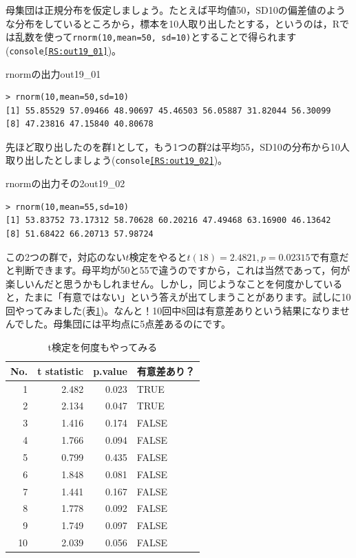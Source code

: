 \documentclass{ltjsarticle}
\begin{document}
{母集団は正規分布を仮定しましょう。たとえば平均値50，SD10の偏差値のような分布をしているところから，標本を10人取り出したとする，というのは，Rでは乱数を使って\texttt{rnorm(10,mean=50, sd=10)}とすることで得られます(\texttt{console\ref{RS:out19_01}})。

\begin{Rscreen}{rnormの出力}{out19_01}
	\begin{verbatim}
> rnorm(10,mean=50,sd=10)
[1] 55.85529 57.09466 48.90697 45.46503 56.05887 31.82044 56.30099 
[8] 47.23816 47.15840 40.80678
\end{verbatim}
\end{Rscreen}

先ほど取り出したのを群1として，もう1つの群2は平均55，SD10の分布から10人取り出したとしましょう(\texttt{console\ref{RS:out19_02}})。

\begin{Rscreen}{rnormの出力その2}{out19_02}
	\begin{verbatim}
> rnorm(10,mean=55,sd=10)
[1] 53.83752 73.17312 58.70628 60.20216 47.49468 63.16900 46.13642 
[8] 51.68422 66.20713 57.98724
\end{verbatim}
\end{Rscreen}

この2つの群で，対応のない$t$検定をやると$t(18)=2.4821,p=0.02315$で有意だと判断できます。母平均が50と55で違うのですから，これは当然であって，何が楽しいんだと思うかもしれません。しかし，同じようなことを何度かしていると，たまに「有意ではない」という答えが出てしまうことがあります。試しに10回やってみました(表\ref{tbl::19_03})。なんと！10回中8回は有意差ありという結果になりませんでした。母集団には平均点に5点差あるのにです。

\begin{table}[ht]
	\centering
	\caption{t検定を何度もやってみる}
	\begin{tabular}{rrrl}
		\hline
		No. & t statistic & p.value & 有意差あり？ \\
		\hline
		1   & 2.482       & 0.023   & TRUE   \\
		2   & 2.134       & 0.047   & TRUE   \\
		3   & 1.416       & 0.174   & FALSE  \\
		4   & 1.766       & 0.094   & FALSE  \\
		5   & 0.799       & 0.435   & FALSE  \\
		6   & 1.848       & 0.081   & FALSE  \\
		7   & 1.441       & 0.167   & FALSE  \\
		8   & 1.778       & 0.092   & FALSE  \\
		9   & 1.749       & 0.097   & FALSE  \\
		10  & 2.039       & 0.056   & FALSE  \\
		\hline
	\end{tabular}
	\label{tbl::19_03}
\end{table}

}
\end{document}
